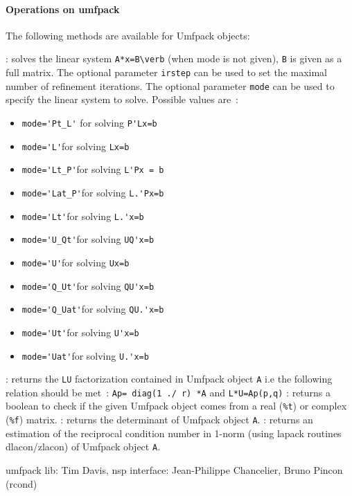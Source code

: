 \paragraph{Operations on umfpack}
The following methods are available for Umfpack objects:
\begin{varlist}
  : solves the linear system \verb+A*x=B\verb+ (when mode is not given), \verb+B+ is given as a full 
   matrix. The optional parameter \verb+irstep+ can be used to set the maximal number of refinement iterations.
   The optional parameter \verb+mode+ can be used to specify the linear system to solve. Possible values are~:
     \begin{itemize} 
        \item \verb+mode='Pt_L'+ for solving \verb+P'Lx=b+
        \item \verb+mode='L'+for solving \verb+Lx=b+
        \item \verb+mode='Lt_P'+for solving \verb+L'Px = b+
        \item \verb+mode='Lat_P'+for solving \verb+L.'Px=b+
        \item \verb+mode='Lt'+for solving \verb+L.'x=b+
        \item \verb+mode='U_Qt'+for solving \verb+UQ'x=b+
        \item \verb+mode='U'+for solving \verb+Ux=b+
        \item \verb+mode='Q_Ut'+for solving \verb+QU'x=b+
        \item \verb+mode='Q_Uat'+for solving \verb+QU.'x=b+
        \item \verb+mode='Ut'+for solving \verb+U'x=b+
        \item \verb+mode='Uat'+for solving \verb+U.'x=b+
     \end{itemize}
  : returns the \verb+LU+ factorization contained in Umfpack object \verb+A+ i.e the following relation should be met~: \verb+Ap= diag(1 ./ r) *A+ and 
  \verb+L*U=Ap(p,q)+ 
  : returns a boolean to check if the given Umfpack object comes from a real 
  (\verb+%t+) or complex (\verb+%f+) matrix. 
  : returns the determinant of Umfpack object \verb+A+.
  : returns an estimation of the reciprocal condition
  number in 1-norm (using lapack routines dlacon/zlacon) of Umfpack object \verb+A+.
  \end{varlist}

\begin{examples}
  \begin{program} 
  \end{program}
 \end{examples}

\begin{authors}
   umfpack lib: Tim Davis, nsp interface: Jean-Philippe Chancelier,
   Bruno Pincon (rcond)
\end{authors}
